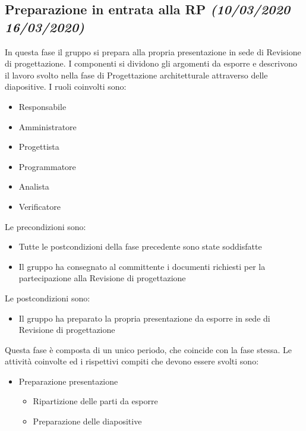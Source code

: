 \documentclass[../piano-di-progetto.tex]{subfiles}
\begin{document}
\subsection[Preparazione in entrata alla RP]{Preparazione in entrata alla RP {\normalsize\normalfont\itshape(10/03/2020  16/03/2020)}}%
\label{sub:preparazione_in_entrata_alla_rp}
In questa fase il gruppo si prepara alla propria presentazione in sede di Revisione di progettazione.
I componenti si dividono gli argomenti da esporre e descrivono il lavoro svolto nella fase di Progettazione architetturale attraverso delle diapositive.
I ruoli coinvolti sono:
\begin{itemize}
  \item Responsabile
  \item Amministratore
  \item Progettista
  \item Programmatore
  \item Analista
  \item Verificatore
\end{itemize}
Le precondizioni sono:
\begin{itemize}
  \item Tutte le postcondizioni della fase precedente sono state soddisfatte
  \item Il gruppo ha consegnato al committente i documenti richiesti per la partecipazione alla Revisione di progettazione
\end{itemize}
Le postcondizioni sono:
\begin{itemize}
  \item Il gruppo ha preparato la propria presentazione da esporre in sede di Revisione di progettazione
\end{itemize}
Questa fase è composta di un unico periodo, che coincide con la fase stessa.
Le attività coinvolte ed i rispettivi compiti che devono essere svolti sono:
\begin{itemize}
  \item Preparazione presentazione
  \begin{itemize}
    \item Ripartizione delle parti da esporre
    \item Preparazione delle diapositive
  \end{itemize}
\end{itemize}
\end{document}
